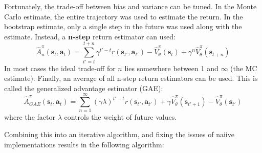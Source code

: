 Fortunately, the trade-off between bias and variance can be tuned.
In the Monte Carlo estimate, the entire trajectory was used
to estimate the return. In the bootstrap estimate,
only a single step in the future was used along with the estimate.
Instead, a \textbf{n-step} return estimator can used:
\begin{equation}
		\hat{A}^\pi_n (\bm{s}_{t}, \bm{a}_{t}) =
		\sum_{t'=t}^{t+n} \gamma^{t'-t} r(\bm{s}_{t'}, \bm{a}_{t'})
		- \hat{V}^\pi_\theta(\bm{s}_t) + \gamma^n \hat{V}^\pi_\theta(\bm{s}_{t+n})
\end{equation}
In most cases
the ideal trade-off for $ n  $ lies somewhere between 1 and $\infty$ (the MC estimate).
Finally, an average of all n-step return estimators can be used.
This is called the generalized advantage estimator (GAE):
\begin{equation}
\hat{A}^\pi_{GAE} (\bm{s}_{t}, \bm{a}_{t}) =
\sum_{n=1}^{\infty} (\gamma \lambda)^{t'-t}r(\bm{s}_{t'}, \bm{a}_{t'}) + \gamma \hat{V}^\pi_\theta(\bm{s}_{t'+1})  - \hat{V}^\pi_\theta(\bm{s}_{t'})
\end{equation}
where the factor $ \lambda  $ controls the weight of future values.

Combining this into an iterative algorithm, and fixing the issues
of naiive implementations results in the following algorithm:


